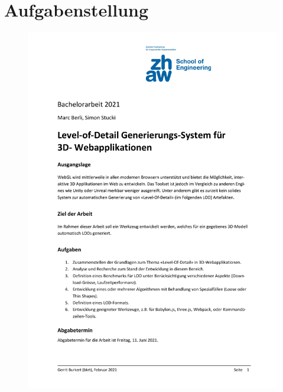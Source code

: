 \section{Aufgabenstellung}
\label{sec:aufgabenstellung}
\begin{figure}[H]
  \centering
  \includegraphics[page=1,scale=0.55]{../ressources/Aufgabenstellung.pdf}
\end{figure}
